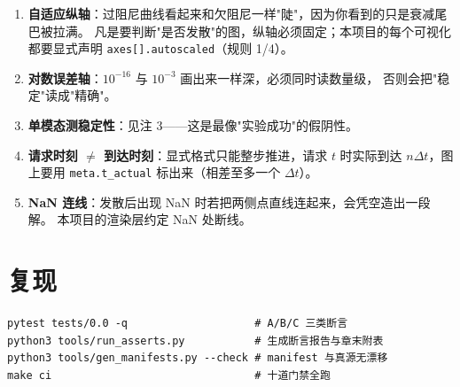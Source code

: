 \begin{enumerate}
  \item \textbf{自适应纵轴}：过阻尼曲线看起来和欠阻尼一样"陡"，因为你看到的只是衰减尾巴被拉满。
        凡是要判断"是否发散"的图，纵轴必须固定；本项目的每个可视化都要显式声明
        \texttt{axes[].autoscaled}（规则 1/4）。
  \item \textbf{对数误差轴}：$10^{-16}$ 与 $10^{-3}$ 画出来一样深，必须同时读数量级，
        否则会把"稳定"读成"精确"。
  \item \textbf{单模态测稳定性}：见注 3——这是最像"实验成功"的假阴性。
  \item \textbf{请求时刻 $\neq$ 到达时刻}：显式格式只能整步推进，请求 $t$ 时实际到达
        $n\Delta t$，图上要用 \texttt{meta.t\_actual} 标出来（相差至多一个 $\Delta t$）。
  \item \textbf{NaN 连线}：发散后出现 NaN 时若把两侧点直线连起来，会凭空造出一段解。
        本项目的渲染层约定 NaN 处断线。
\end{enumerate}

\section{复现}

\begin{verbatim}
pytest tests/0.0 -q                    # A/B/C 三类断言
python3 tools/run_asserts.py           # 生成断言报告与章末附表
python3 tools/gen_manifests.py --check # manifest 与真源无漂移
make ci                                # 十道门禁全跑
\end{verbatim}
